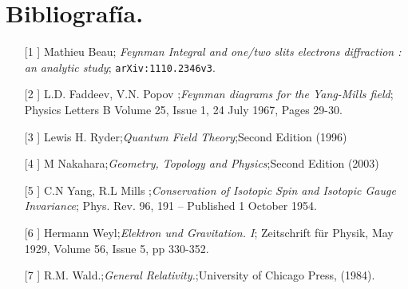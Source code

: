 \chapter{Bibliografía.}
\begin{itemize}
\item[[1]] Mathieu Beau; \textit{Feynman Integral and one/two slits electrons diffraction : an analytic study}; \texttt{arXiv:1110.2346v3}.
\item[[2]]  L.D. Faddeev,  V.N. Popov ;\textit{Feynman diagrams for the Yang-Mills field}; Physics Letters B Volume 25, Issue 1, 24 July 1967, Pages 29-30.
\item[[3]] Lewis H. Ryder;\textit{Quantum Field Theory};Second Edition (1996) 
\item[[4]] M Nakahara;\textit{Geometry, Topology and Physics};Second Edition (2003) 
\item[[5]]  C.N Yang,  R.L Mills ;\textit{Conservation of Isotopic Spin and Isotopic Gauge Invariance}; Phys. Rev. 96, 191 – Published 1 October 1954.
\item[[6]]  Hermann Weyl;\textit{Elektron und Gravitation. I}; Zeitschrift für Physik, May 1929, Volume 56, Issue 5, pp 330-352.
\item[[7]] R.M. Wald.;\textit{General Relativity.};University of Chicago Press, (1984). 
\end{itemize}
